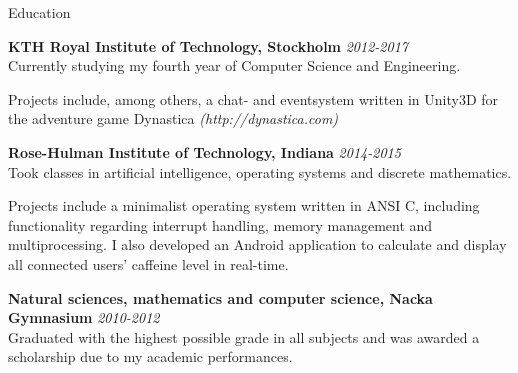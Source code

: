 \documentclass{resume} %
\begin{document}

\begin{rSection}{Education}

{\bf KTH Royal Institute of Technology, Stockholm} \hfill {\em 2012-2017} \\ 
Currently studying my fourth year of Computer Science and Engineering.

Projects include, among others, a chat- and eventsystem written in Unity3D for the adventure game Dynastica \textit{(http://dynastica.com)}

{\bf Rose-Hulman Institute of Technology, Indiana} \hfill {\em 2014-2015} \\ 
Took classes in artificial intelligence, operating systems and discrete mathematics.

Projects include a minimalist operating system written in ANSI C, including functionality regarding interrupt handling, memory management and multiprocessing. I also developed an Android application to calculate and display all connected users' caffeine level in real-time. 

{\bf Natural sciences, mathematics and computer science, Nacka Gymnasium} \hfill {\em 2010-2012} \\ 
Graduated with the highest possible grade in all subjects and was awarded a scholarship due to my academic performances.

\end{rSection}

\end{document}

